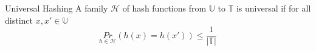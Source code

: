\documentclass[english]{panikzettel}
\begin{document}
\begin{defi}{Universal Hashing}
A family $\mathcal{H}$ of hash functions from $\mathbb{U}$ to $\mathbb{T}$ is universal if for all distinct $x,x'\in \mathbb{U}$
\[
\underset{h\in\mathcal{H}}{Pr}(h(x)=h(x'))\leq \frac{1}{|\mathbb{T}|}
\]
\end{defi}


%
\end{document}

